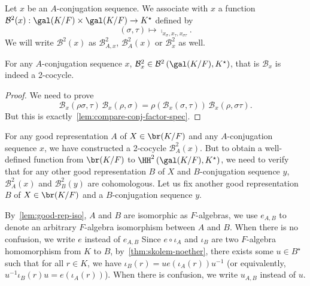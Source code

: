\begin{construction}
  \label{con:good-rep-to-2-cocycles}
  Let $x$ be an $A$-conjugation sequence. We associate with $x$ a function $\mathcal{B}^{2}(x) : \gal(K/F)\times\gal(K/F)\to K^{\star}$ defined by
  \[
    (\sigma,\tau)\mapsto \comp_{x_{\sigma},x_{\tau},x_{\sigma\tau}}.
  \]
  We will write $\mathcal{B}^{2}(x)$ as $\mathcal{B}^{2}_{A, x}$, $\mathcal{B}^{2}_{A}(x)$ or $\mathcal{B}^{2}_{x}$ as well.
  \leanok
\end{construction}

\begin{lemma}
  For any $A$-conjugation sequence $x$, $\mathcal{B}^{2}_{x} \in \mathcal{B}^{2}\left(\gal(K/F), K^{\star}\right)$, that is $\mathcal{B}_{x}$ is indeed a 2-cocycle.
  \leanok
\end{lemma}

\begin{proof}
  We need to prove
  \[
    \mathcal{B}_{x}(\rho\sigma, \tau)\, \mathcal{B}_{x}(\rho,\sigma) = \rho\left(\mathcal{B}_{x}(\sigma, \tau)\right)\, \mathcal{B}_{x}(\rho, \sigma\tau).
  \]
  But this is exactly~\cref{lem:compare-conj-factor-spec}.
\end{proof}

For any good representation $A$ of $X \in \br(K/F)$ and any $A$-conjugation sequence $x$, we have constructed a 2-cocycle $\mathcal{B}^{2}_{A}(x)$. But to obtain a well-defined function from $\br(K/F)$ to $\HH^{2}\left(\gal(K/F), K^{\star}\right)$, we need to verify that for any other good representation $B$ of $X$ and $B$-conjugation sequence $y$, $\mathcal{B}^{2}_{A}(x)$ and $\mathcal{B}^{2}_{B}(y)$ are cohomologous. Let us fix another good representation $B$ of $X \in \br(K/F)$ and a $B$-conjugation sequence $y$.

\begin{construction}\label{con:good-rep-iso-coeff}
  By~\cref{lem:good-rep-iso}, $A$ and $B$ are isomorphic as $F$-algebras, we use $e_{A,B}$ to denote an arbitrary $F$-algebra isomorphism between $A$ and $B$. When there is no confusion, we write $e$ instead of $e_{A, B}$ Since $e \circ \iota_{A}$ and $\iota_{B}$ are two $F$-algebra homomorphism from $K$ to $B$, by~\cref{thm:skolem-noether}, there exists some $u \in B^{\star}$ such that for all $r \in K$, we have $\iota_{B}(r) = ue\left(\iota_{A}(r)\right)u^{-1}$ (or equivalently, $u^{-1}\iota_{B}(r)u = e\left(\iota_{A}(r)\right)$). When there is confusion, we write $u_{A, B}$ instead of $u$.
\end{construction}

